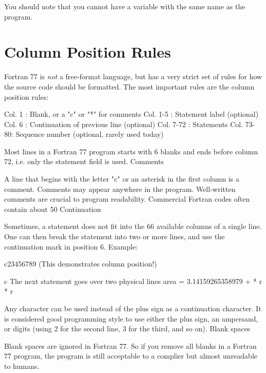 You should note that you cannot have a variable with the same name as
the program.


\section*{Column Position Rules}

Fortran 77 is \textit{not} a free-format language, but has a very strict
set of rules for how the source code should be formatted. The most
important rules are the column position rules:

\begin{plainl}
Col. 1    : Blank, or a "c" or "*" for comments
Col. 1-5  : Statement label (optional)
Col. 6    : Continuation of previous line (optional)
Col. 7-72 : Statements
Col. 73-80: Sequence number (optional, rarely used today)
\end{plainl}

Most lines in a Fortran 77 program starts with 6 blanks and ends before column 72, i.e. only the statement field is used.
Comments

A line that begins with the letter "c" or an asterisk in the first column is a comment. Comments may appear anywhere in the program. Well-written comments are crucial to program readability. Commercial Fortran codes often contain about 50%
Continuation

Sometimes, a statement does not fit into the 66 available columns of a single line. One can then break the statement into two or more lines, and use the continuation mark in position 6. Example:

c23456789 (This demonstrates column position!)

c The next statement goes over two physical lines
      area = 3.14159265358979
     +       * r * r

Any character can be used instead of the plus sign as a continuation character. It is considered good programming style to use either the plus sign, an ampersand, or digits (using 2 for the second line, 3 for the third, and so on).
Blank spaces

Blank spaces are ignored in Fortran 77. So if you remove all blanks in a Fortran 77 program, the program is still acceptable to a complier but almost unreadable to humans.

\footer
